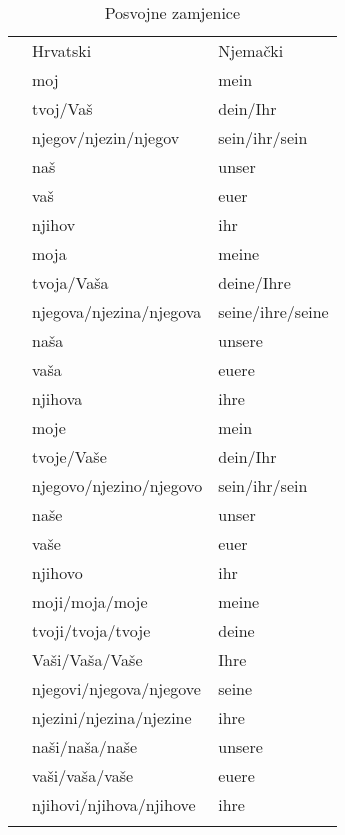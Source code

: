 \documentclass[12pt,german]{article}
\newenvironment{zamjenicetbl}[1]
{%
  \begin{table}[H]
    \caption{#1 zamjenice}
    \begin{tabular}{lll}
    \toprule
      & Hrvatski  &  Njemački \\
}{%
      \bottomrule
    \end{tabular}
  \end{table}}
\begin{document}
\begin{multicols}{2}
\begin{zamjenicetbl}{Posvojne}
  \zamjenicepadez{Muški rod}
    & moj           & mein \\
    & tvoj/Vaš      & dein/Ihr \\
    & njegov/njezin/njegov & sein/ihr/sein \\
    & naš           & unser \\
    & vaš           & euer \\
    & njihov        & ihr \\
  \endzamjenicepadez
  \zamjenicepadez{Ženski rod}
    & moja         & meine \\
    & tvoja/Vaša & deine/Ihre \\
    & njegova/njezina/njegova & seine/ihre/seine \\
    & naša & unsere \\
    & vaša & euere \\
    & njihova & ihre \\
  \endzamjenicepadez
  \zamjenicepadez{Srednji rod}
    & moje   & mein \\
    & tvoje/Vaše   & dein/Ihr \\
    & njegovo/njezino/njegovo   & sein/ihr/sein \\
    & naše   & unser \\
    & vaše   & euer \\
    & njihovo   & ihr \\
  \endzamjenicepadez
  \zamjenicepadez{Množina}
    & moji/moja/moje & meine       \\
    & tvoji/tvoja/tvoje & deine \\
    & Vaši/Vaša/Vaše & Ihre \\
    & njegovi/njegova/njegove & seine  \\
    & njezini/njezina/njezine & ihre \\
    & naši/naša/naše & unsere \\
    & vaši/vaša/vaše & euere \\
    & njihovi/njihova/njihove & ihre \\
  \endzamjenicepadez
\end{zamjenicetbl}


\end{multicols}
\end{document}
